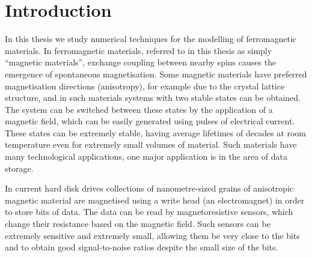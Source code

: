 
\chapter{Introduction}
\label{sec:introduction}

In this thesis we study numerical techniques for the modelling of ferromagnetic materials.
In ferromagnetic materials, referred to in this thesis as simply ``magnetic materials'', exchange coupling between nearby spins causes the emergence of spontaneous magnetisation.
Some magnetic materials have preferred magnetisation directions (anisotropy), for example due to the crystal lattice structure, and in such materials systems with two stable states can be obtained.
The system can be switched between these states by the application of a magnetic field, which can be easily generated using pulses of electrical current.
These states can be extremely stable, having average lifetimes of decades at room temperature even for extremely small volumes of material.
Such materials have many technological applications, one major application is in the area of data storage.

In current hard disk drives collections of nanometre-sized grains of anisotropic magnetic material are magnetised using a write head (an electromagnet) in order to store bits of data.
The data can be read by magnetoresistive sensors, which change their resistance based on the magnetic field.
Such sensors can be extremely sensitive and extremely small, allowing them be very close to the bits and to obtain good signal-to-noise ratios despite the small size of the bits.

